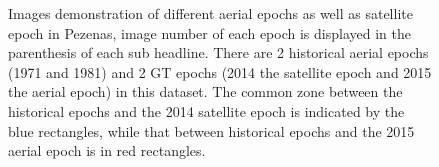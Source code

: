 \begin{figure}[htbp]
\begin{center}
{\begin{minipage}[t]{0.48\linewidth}
    	\end{minipage}%
    }
        \caption{Images demonstration of different aerial epochs as well as satellite epoch in Pezenas, image number of each epoch is displayed in the parenthesis of each sub headline. There are 2 historical aerial epochs (1971 and 1981) and 2 GT epochs (2014 the satellite epoch and 2015 the aerial epoch) in this dataset. The common zone between the historical epochs and the 2014 satellite epoch is indicated by the blue rectangles, while that between historical epochs and the 2015 aerial epoch is in red rectangles.}
        \label{PezenasData}
    \end{center}
\end{figure} 


